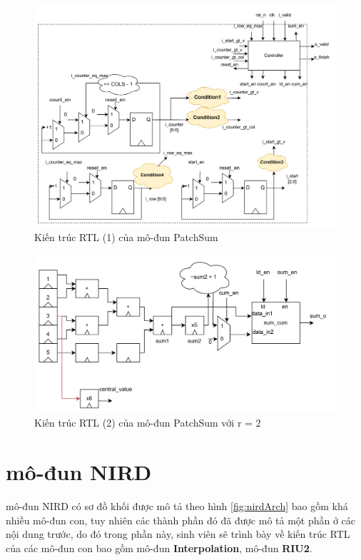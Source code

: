 \begin{figure}[!ht]
	\centering
	\includegraphics[width=\linewidth]{figures/patchSumRTL.png}
	\caption{Kiến trúc RTL (1) của mô-đun PatchSum}
	\label{fig:patchSumRTL}
\end{figure}
\begin{figure}[!ht]
	\centering
	\includegraphics[width=1\linewidth]{figures/patchSumRTL_2.png}
	\caption{Kiến trúc RTL (2) của mô-đun PatchSum với r = 2}
	\label{fig:patchSumRTL_2}
\end{figure}

\section{mô-đun NIRD}
mô-đun NIRD có sơ đồ khối được mô tả theo hình \ref{fig:nirdArch} bao gồm khá nhiều mô-đun con, tuy nhiên các thành phần đó đã được mô tả một phần ở các nội dung trước, do đó trong phần này, sinh viên sẽ trình bày về kiến trúc RTL của các mô-đun con bao gồm mô-đun \textbf{Interpolation}, mô-đun \textbf{RIU2}.
